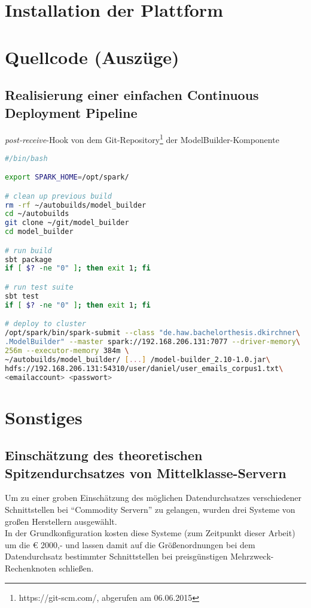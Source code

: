 \begin{appendices}
\section{Installation der Plattform}
\section{Quellcode (Auszüge)}
\subsection{Realisierung einer einfachen Continuous Deployment Pipeline}
\textit{post-receive}-Hook von dem Git-Repository\footnote{https://git-scm.com/, abgerufen am 06.06.2015} der ModelBuilder-Komponente
\begin{lstlisting}[language=Bash,caption={Primitive Continuous Deployment Pipeline. Beispiel: ModelBuilder},label={lst:cdp_modelbuilder}]
#/bin/bash

export SPARK_HOME=/opt/spark/

# clean up previous build
rm -rf ~/autobuilds/model_builder
cd ~/autobuilds
git clone ~/git/model_builder
cd model_builder

# run build
sbt package
if [ $? -ne "0" ]; then exit 1; fi

# run test suite
sbt test
if [ $? -ne "0" ]; then exit 1; fi

# deploy to cluster
/opt/spark/bin/spark-submit --class "de.haw.bachelorthesis.dkirchner\
.ModelBuilder" --master spark://192.168.206.131:7077 --driver-memory\
256m --executor-memory 384m \
~/autobuilds/model_builder/ [...] /model-builder_2.10-1.0.jar\
hdfs://192.168.206.131:54310/user/daniel/user_emails_corpus1.txt\
<emailaccount> <passwort>
\end{lstlisting}

\section{Sonstiges}
\subsection{Einschätzung des theoretischen Spitzendurchsatzes von Mittelklasse-Servern}
\label{subsec:commodity_servers}
Um zu einer groben Einschätzung des möglichen Datendurchsatzes verschiedener Schnittstellen bei "`Commodity Servern"' zu gelangen, wurden drei Systeme von großen Herstellern ausgewählt.\\
In der Grundkonfiguration kosten diese Systeme (zum Zeitpunkt dieser Arbeit) um die € 2000,- und lassen damit auf die Größenordnungen bei dem Datendurchsatz bestimmter Schnittstellen bei preisgünstigen Mehrzweck-Rechenknoten schließen.


\end{appendices}
